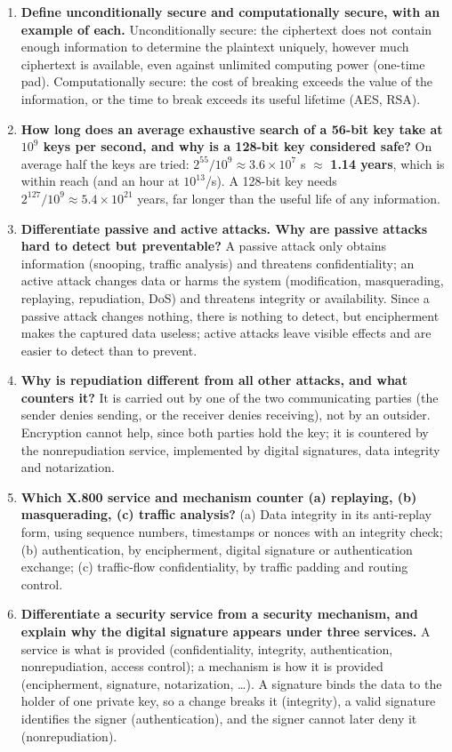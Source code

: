 \begin{enumerate}[leftmargin=1.6em,itemsep=3pt]
  \item \textbf{Define unconditionally secure and computationally secure, with an example of each.} Unconditionally secure: the ciphertext does not contain enough information to determine the plaintext uniquely, however much ciphertext is available, even against unlimited computing power (one-time pad). Computationally secure: the cost of breaking exceeds the value of the information, or the time to break exceeds its useful lifetime (AES, RSA).
  \item \textbf{How long does an average exhaustive search of a 56-bit key take at $10^9$ keys per second, and why is a 128-bit key considered safe?} On average half the keys are tried: $2^{55}/10^9 \approx 3.6 \times 10^7$ s $\approx$ \textbf{1.14 years}, which is within reach (and an hour at $10^{13}$/s). A 128-bit key needs $2^{127}/10^9 \approx 5.4 \times 10^{21}$ years, far longer than the useful life of any information.
  \item \textbf{Differentiate passive and active attacks. Why are passive attacks hard to detect but preventable?} A passive attack only obtains information (snooping, traffic analysis) and threatens confidentiality; an active attack changes data or harms the system (modification, masquerading, replaying, repudiation, DoS) and threatens integrity or availability. Since a passive attack changes nothing, there is nothing to detect, but encipherment makes the captured data useless; active attacks leave visible effects and are easier to detect than to prevent.
  \item \textbf{Why is repudiation different from all other attacks, and what counters it?} It is carried out by one of the two communicating parties (the sender denies sending, or the receiver denies receiving), not by an outsider. Encryption cannot help, since both parties hold the key; it is countered by the nonrepudiation service, implemented by digital signatures, data integrity and notarization.
  \item \textbf{Which X.800 service and mechanism counter (a) replaying, (b) masquerading, (c) traffic analysis?} (a) Data integrity in its anti-replay form, using sequence numbers, timestamps or nonces with an integrity check; (b) authentication, by encipherment, digital signature or authentication exchange; (c) traffic-flow confidentiality, by traffic padding and routing control.
  \item \textbf{Differentiate a security service from a security mechanism, and explain why the digital signature appears under three services.} A service is what is provided (confidentiality, integrity, authentication, nonrepudiation, access control); a mechanism is how it is provided (encipherment, signature, notarization, \dots). A signature binds the data to the holder of one private key, so a change breaks it (integrity), a valid signature identifies the signer (authentication), and the signer cannot later deny it (nonrepudiation).

\end{enumerate}
